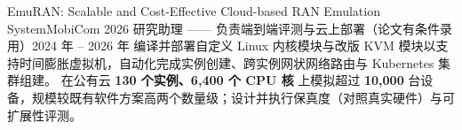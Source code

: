     \resumeSubheading
      {EmuRAN: Scalable and Cost-Effective Cloud-based RAN Emulation System}{MobiCom 2026}
      {研究助理 —— 负责端到端评测与云上部署（论文有条件录用）}{2024 年 -- 2026 年}
      \resumeItemListStart
          {编译并部署自定义 Linux 内核模块与改版 KVM 模块以支持时间膨胀虚拟机，自动化完成实例创建、跨实例网状网络路由与 Kubernetes 集群组建。}
          {在公有云 \textbf{130 个实例、6{,}400 个 CPU 核} 上模拟超过 \textbf{10{,}000} 台设备，规模较既有软件方案高两个数量级；设计并执行保真度（对照真实硬件）与可扩展性评测。}
      \resumeItemListEnd
